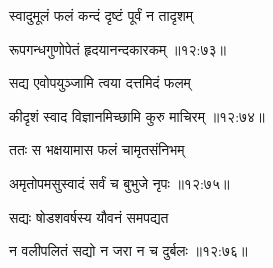 {\devanagarifont स्वादुमूलं फलं कन्दं दृष्टं पूर्वं न तादृशम् \thinspace{\dandab} \dontdisplaylinenum }%


{\devanagarifont रूपगन्धगुणोपेतं हृदयानन्दकारकम् {॥१२:७३॥} \veg\dontdisplaylinenum }%

{\devanagarifont सद्य एवोपयुञ्जामि त्वया दत्तमिदं फलम् \thinspace{\dandab} \dontdisplaylinenum }%


{\devanagarifont कीदृशं स्वाद विज्ञानमिच्छामि कुरु माचिरम् {॥१२:७४॥} \veg\dontdisplaylinenum }%

{\devanagarifont ततः स भक्षयामास फलं चामृतसंनिभम् \thinspace{\dandab} \dontdisplaylinenum }%


{\devanagarifont अमृतोपमसुस्वादं सर्वं च बुभुजे नृपः {॥१२:७५॥} \veg\dontdisplaylinenum }%

{\devanagarifont सद्यः षोडशवर्षस्य यौवनं समपद्यत \thinspace{\dandab} \dontdisplaylinenum }%


{\devanagarifont न वलीपलितं सद्यो न जरा न च दुर्बलः {॥१२:७६॥} \veg\dontdisplaylinenum }%

